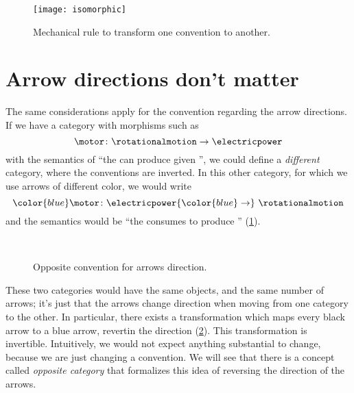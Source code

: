 \begin{figure}[h]
    \texttt{[image: isomorphic]}
    \caption{Mechanical rule to transform one convention to another.}
\end{figure}


\section{Arrow directions don't matter}
The same considerations apply for the convention regarding the arrow directions.
If we have a category with morphisms such as
\begin{equation*}
	\motor \colon \rotationalmotion \to \electricpower
\end{equation*}
with the semantics of ``the \motor can produce \rotationalmotion given \electricpower'', we could define a \emph{different} category, where the conventions are inverted.
In this other category, for which we use arrows of different color, we would write
\begin{equation*}
	{\color{blue}\motor}
	\colon \electricpower {\color{blue} \to}\  \rotationalmotion
\end{equation*}
and the semantics would be ``the \motor consumes \electricpower to produce \rotationalmotion'' (\cref{fig:inverted}).

\begin{figure}[h!]
	\centering
	\\[+15pt]
	\caption{Opposite convention for arrows direction. }
	\label{fig:inverted}
\end{figure}

These two categories would have the same objects, and the same number of arrows; it's just that the arrows change direction when moving from one category to the other.
In particular, there exists a transformation which maps every black arrow to a blue arrow, revertin the direction (\cref{fig:inverted_2}).
This transformation is invertible.
Intuitively, we would not expect anything substantial to change, because we are just changing a convention.
We will see that there is a concept called \emph{opposite category} that formalizes this idea of reversing the direction of the arrows.

\begin{figure}[h!]
	\centering
	\caption{}
	\label{fig:inverted_2}
\end{figure}

